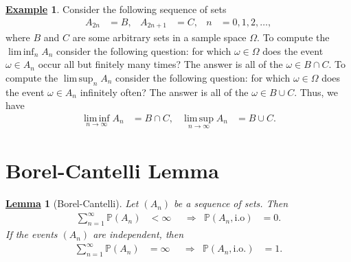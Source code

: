 \documentclass[12pt]{book}
\numberwithin{equation}{chapter}
\theoremstyle{plain}
\numberwithin{theorem}{section}
\newtheorem{lemma}[theorem]{\underline{Lemma}}   		%
\theoremstyle{definition}
\newtheorem{example}[theorem]{\underline{Example}}
\numberwithin{exercise}{chapter}
\newcommand{\<}{\langle}
\renewcommand{\>}{\rangle}
\renewcommand{\(}{\left(}
\renewcommand{\)}{\right)}
\renewcommand{\[}{\left[}
\renewcommand{\]}{\right]}
\newcommand\Pb{\mathds{P}}
\newcommand\om{\omega}
\newcommand\Om{\Omega}
\renewcommand\limsup{\operatorname*{lim \, sup}}
\renewcommand\liminf{\operatorname*{lim \, inf}}
\begin{document}
\begin{example}
Consider the following sequence of sets
\begin{align}
A_{2n}
	&=	B , &
A_{2n+1}
	&=	C , &
n
	&=	0, 1, 2, \ldots ,
\end{align}
where $B$ and $C$ are some arbitrary sets in a sample space $\Om$.
To compute the $\liminf_n A_n$ consider the following question: for which $\om \in \Om$ does the event $\om \in A_n$ occur all but finitely many times?  The answer is all of the $\om \in B \cap C$.  
To compute the $\limsup_n A_n$ consider the following question: for which $\om \in \Om$ does the event $\om \in A_n$ infinitely often?  The answer is all of the $\om \in B \cup C$.  
Thus, we have
\begin{align}
\liminf_{n \to \infty} A_n
	&=	B \cap C , &
\limsup_{n \to \infty} A_n
	&=	B \cup C .
\end{align}
\end{example}


\section{Borel-Cantelli Lemma}
\label{sec:borel-cantelli}


\begin{lemma}[Borel-Cantelli]
\label{thm:borel-cantelli}
Let $(A_n)$ be a sequence of sets.  Then
\begin{align}
\sum_{n=1}^\infty \Pb(A_n)
	&<\infty &
	&\Rightarrow&
\Pb(A_n, \text{i.o})
	&=	0 . \label{eq:bc1}
\end{align}
If the events $(A_n)$ are independent, then
\begin{align}
\sum_{n=1}^\infty \Pb(A_n)
	&=	\infty &
	&\Rightarrow&
\Pb(A_n, \text{i.o.})
	&= 1 . \label{eq:bc2}
\end{align}
\end{lemma}
\end{document}
